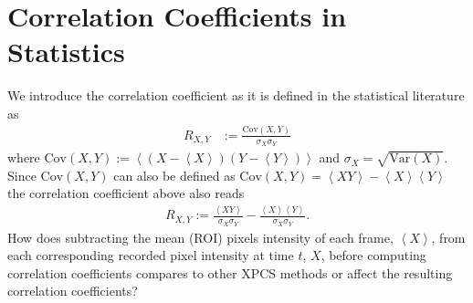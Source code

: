 \documentclass[11pt]{article}
\def\addMA#1{{\noindent\color{blue}{#1}}}
\theoremstyle{definition}
\begin{document}
\section{Correlation Coefficients in Statistics}
%
%
We introduce the correlation coefficient as it is defined in the statistical literature \cite[Sec. 27.8]{Kendall63_2a} as
%
\begin{align}
R_{X, Y} &:= \frac{\text{Cov}(X, Y)}{\sigma_X \sigma_Y} \label{eqn:Rxy1}
\end{align}
%
where $\text{Cov}(X,Y):= \left < (X - \left<X\right>) (Y- \left<Y\right>) \right>$ and $\sigma_X = \sqrt{\text{Var} (X)} 
$. 
%
Since $\text{Cov}(X,Y)$ can also be defined as $\text{Cov}(X,Y) = \left < X Y \right> - \left<X\right> \left<Y\right>$ the correlation coefficient above also reads 
%
\begin{align}\label{eqn:Rxy2}
R_{X,  Y} := \frac{\left < XY \right >}{\sigma_X \sigma_Y} - \frac{\left<X\right> \left<Y\right>}{\sigma_X \sigma_Y}.
\end{align}
%
% 
%
%
%
How does subtracting the mean (ROI) pixels intensity of each frame, \(\left<X\right>\), from each corresponding recorded pixel intensity at time $t$, \(X\), before computing correlation coefficients compares to other XPCS methods or affect the resulting correlation coefficients? \addMA{[Should we suppress this paragraph? (it cannot be understood without knowing that the mean of a exponential RV is equal to its STD, which is stated in the next section).]}
\end{document}
